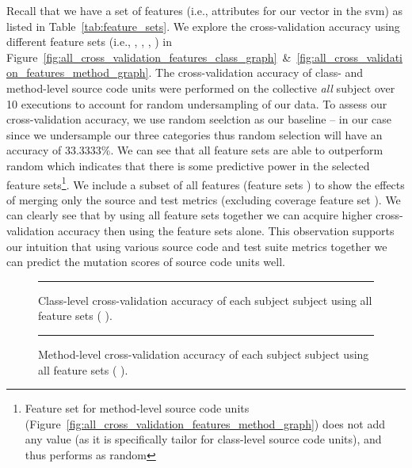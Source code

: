 Recall that we have a set of features (i.e., attributes for our vector in the \gls{svm}) as listed in Table~\ref{tab:feature_sets}. We explore the cross-validation accuracy using different feature sets (i.e., , , , ) in Figure~\ref{fig:all_cross_validation_features_class_graph}~\&~\ref{fig:all_cross_validation_features_method_graph}. The cross-validation accuracy of class- and method-level source code units were performed on the collective \emph{all} subject over 10 executions to account for random undersampling of our data. To assess our cross-validation accuracy, we use random seelction as our baseline -- in our case since we undersample our three categories thus random selection will have an accuracy of 33.3333\%. We can see that all feature sets are able to outperform random which indicates that there is some predictive power in the selected feature sets\footnote{Feature set  for method-level source code units (Figure~\ref{fig:all_cross_validation_features_method_graph}) does not add any value (as it is specifically tailor for class-level source code units), and thus performs as random}. We include a subset of all features (feature sets   ) to show the effects of merging only the source and test metrics (excluding coverage feature set ). We can clearly see that by using all feature sets together we can acquire higher cross-validation accuracy then using the feature sets alone. This observation supports our intuition that using various source code and test suite metrics together we can predict the mutation scores of source code units well.

\begin{figure}[!ht]
  \centering
  \begin{adjustbox}{max size={.95\textwidth}{.95\textheight}}
    
  \end{adjustbox}
  \caption{Class-level cross-validation accuracy of each subject subject using all feature sets (   ).}
  \vspace{1mm}
  \footnotesize{\emph{}}
  \vspace{2mm}
  \hrule
  \label{fig:individual_cross_validation_class_1_2_3_4_graph}
\end{figure}

\begin{figure}[ht!]
  \centering
  \begin{adjustbox}{max size={.95\textwidth}{.95\textheight}}
    
  \end{adjustbox}
  \caption{Method-level cross-validation accuracy of each subject subject using all feature sets (   ).}
  \vspace{1mm}
  \footnotesize{\emph{}}
  \vspace{2mm}
  \hrule
  \label{fig:individual_cross_validation_method_1_2_3_4_graph}
\end{figure}

